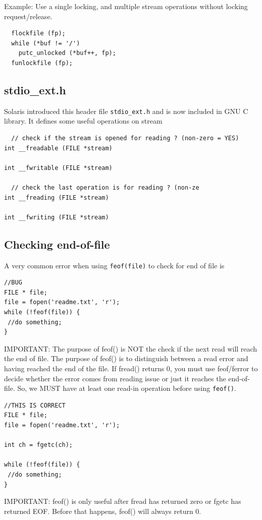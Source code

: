 Example: Use a single locking, and multiple stream operations without locking
request/release.
\begin{Verbatim}
  flockfile (fp);
  while (*buf != '/')
    putc_unlocked (*buf++, fp);
  funlockfile (fp);
\end{Verbatim}


\subsection{stdio\_ext.h}
\label{sec:stdio_ext.h}

Solaris introduced this header file \verb!stdio_ext.h! and is now included in
GNU C library. It defines some useful operations on stream

\begin{verbatim}
  // check if the stream is opened for reading ? (non-zero = YES)
int __freadable (FILE *stream)

int __fwritable (FILE *stream)

  // check the last operation is for reading ? (non-ze
int __freading (FILE *stream)

int __fwriting (FILE *stream)
\end{verbatim}





\subsection{Checking end-of-file}

A very common error when using \verb!feof(file)! to check for end of file is
\begin{verbatim}
//BUG
FILE * file;
file = fopen('readme.txt', 'r');
while (!feof(file)) {
 //do something;
}
\end{verbatim}

IMPORTANT: The purpose of feof() is NOT the check if the next read will reach
the end of file. The purpose of feof() is to distinguish between a read error
and having reached the end of the file. If fread() returns 0, you must use
feof/ferror to decide whether the error comes from reading issue or just it
reaches the end-of-file. So, we MUST have at least one read-in operation before
using \verb!feof()!.
\begin{verbatim}
//THIS IS CORRECT
FILE * file;
file = fopen('readme.txt', 'r');

int ch = fgetc(ch);

while (!feof(file)) {
 //do something;
}
\end{verbatim}
IMPORTANT: feof() is only useful after fread has returned zero or fgetc has
returned EOF. Before that happens, feof() will always return 0.

